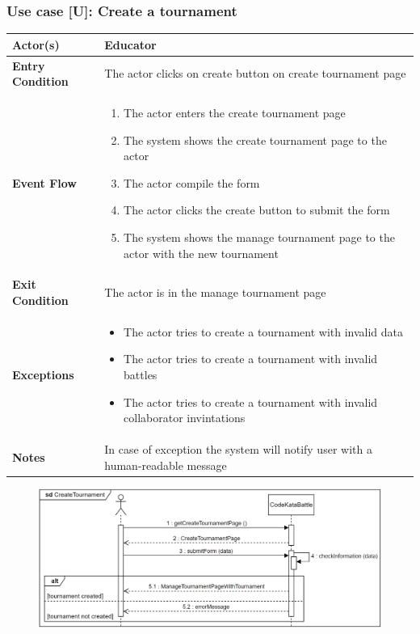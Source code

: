 \documentclass[12pt, a4paper]{report}
\newcounter{useCase}
\newcommand{\usecase}[9]{
    \def\arraystretch{1.5} 
    \subsubsection*{Use case [U#2]: #3}
    \vspace*{0.2cm}
    \begin{center}
        \begin{tabular}{|l|p{12cm}|}
            \hline
            \textbf{Actor(s)} & #4 \\
            \hline
            \textbf{Entry Condition} & #5 \\
            \hline
            \textbf{Event Flow} & #6 \\
            \hline
            \textbf{Exit Condition} & #7 \\
            \hline
            \textbf{Exceptions} & #8 \\
            \hline
            \textbf{Notes} & #9 \\
            \hline
        \end{tabular}
    \end{center}
    #1
}
\begin{document}
        \usecase{\begin{figure}[H]\centering\includegraphics[width=0.9\linewidth]{images/createtournament.png}\end{figure}}        
        {\arabic{useCase}\stepcounter{useCase}}
        {Create a tournament}
        {Educator}
        {The actor clicks on create button on create tournament page}
        {
        \begin{enumerate}
            \item The actor enters the create tournament page
            \item The system shows the create tournament page to the actor
            \item The actor compile the form
            \item The actor clicks the create button to submit the form
            \item The system shows the manage tournament page to the actor with the new tournament
        \end{enumerate}
        }
        {The actor is in the manage tournament page}
        {
        \begin{itemize}
            \item The actor tries to create a tournament with invalid data
            \item The actor tries to create a tournament with invalid battles
            \item The actor tries to create a tournament with invalid collaborator invintations
        \end{itemize}
        }
        {In case of exception the system will notify user with a human-readable message}
        
\end{document}
